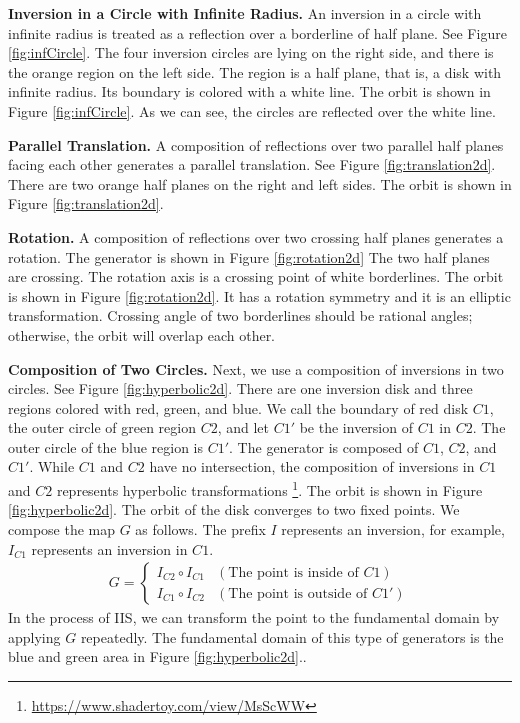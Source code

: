 \noindent\textbf{Inversion in a Circle with Infinite Radius.}
An inversion in a circle with infinite radius is treated as a reflection
over a borderline of half plane. See Figure
\ref{fig:infCircle}.
The four inversion circles are lying on the right side, and there is the
orange region on the left side. The region is a half plane, that is, a
disk with infinite radius. Its boundary is colored with a white line.
The orbit is shown in
Figure \ref{fig:infCircle}.
As we can see, the circles are reflected over the white line.

\noindent\textbf{Parallel Translation.}
A composition of reflections over two parallel half planes facing each
other generates a parallel translation. See Figure
\ref{fig:translation2d}.
There are two orange half planes on the right and left sides.
The orbit is shown in Figure
\ref{fig:translation2d}.

\noindent\textbf{Rotation.}
A composition of reflections over two crossing half planes generates a
rotation. The generator is shown in Figure
\ref{fig:rotation2d}
The two half planes are crossing. The rotation axis is a crossing point of
white borderlines. The orbit is shown in Figure 
\ref{fig:rotation2d}.
It has a rotation symmetry and it is an elliptic transformation.
Crossing angle of two borderlines should be
rational angles; otherwise, the orbit will overlap each other.

\noindent\textbf{Composition of Two Circles.}
 Next, we use a composition of inversions in two circles.
 See Figure \ref{fig:hyperbolic2d}.
 There are one inversion disk and three regions colored with red, green,
 and blue.
 We call the boundary of red disk $C1$, 
 the outer circle of green region $C2$, and
 let $C1'$ be the inversion of $C1$ in $C2$.
 The outer circle of the blue region is $C1'$.
 The generator is composed of $C1$, $C2$, and $C1'$.
 While $C1$ and $C2$ have no intersection, the composition of inversions
 in $C1$ and $C2$ represents hyperbolic transformations
 \footnote{\url{https://www.shadertoy.com/view/MsScWW}}.
 The orbit is shown in Figure
 \ref{fig:hyperbolic2d}.
 The orbit of the disk converges to two fixed points.
 We compose the map $G$ as follows.
 The prefix $I$ represents an inversion, for example, $I_{C1}$ represents
 an inversion in $C1$.
 \begin{align*}
  G =
  \begin{cases}
   I_{C2} \circ I_{C1} & (\text{The point is inside of } C1) \\
   I_{C1} \circ I_{C2} & (\text{The point is outside of }C1')
  \end{cases}
 \end{align*}
 In the process of IIS, we can transform the point to the fundamental
 domain by applying $G$ repeatedly.
 The fundamental domain of this type of generators is the blue and green
 area in Figure \ref{fig:hyperbolic2d}..

